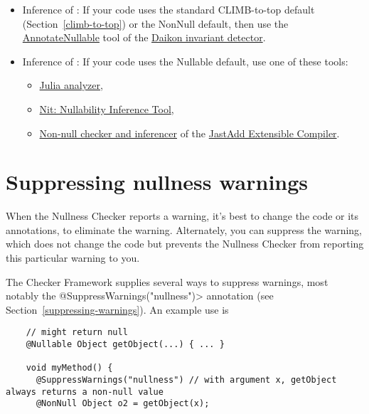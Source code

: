 \begin{itemize}

\item
  Inference of :
  If your code uses the standard CLIMB-to-top default (Section~\ref{climb-to-top}) or
  the NonNull default, then use the
  \href{http://plse.cs.washington.edu/daikon/download/doc/daikon.html#AnnotateNullable}{AnnotateNullable}
  tool of the \href{http://plse.cs.washington.edu/daikon/}{Daikon invariant
    detector}.

\item
  Inference of :
  If your code uses the Nullable default, use one of these tools:
\begin{itemize}
\item
  \href{http://julia.scienze.univr.it/}{Julia analyzer},
\item
  \href{http://nit.gforge.inria.fr}{Nit: Nullability Inference Tool},
\item
  \href{http://jastadd.org/jastadd-tutorial-examples/non-null-types-for-java/}{Non-null
    checker and inferencer} of the \href{http://jastadd.org/}{JastAdd
    Extensible Compiler}.
\end{itemize}

\end{itemize}



\section{Suppressing nullness warnings\label{suppressing-warnings-nullness}}

When the Nullness Checker reports a warning, it's best to change the code
or its annotations, to eliminate the warning.  Alternately, you can
suppress the warning, which does not change the code but prevents the
Nullness Checker from reporting this particular warning to you.

\begin{sloppypar}
The Checker Framework supplies several ways to suppress warnings, most
notably the \<@SuppressWarnings("nullness")> annotation (see
Section~\ref{suppressing-warnings}).  An example use is
\end{sloppypar}

\begin{smaller}
\begin{Verbatim}
    // might return null
    @Nullable Object getObject(...) { ... }

    void myMethod() {
      @SuppressWarnings("nullness") // with argument x, getObject always returns a non-null value
      @NonNull Object o2 = getObject(x);
\end{Verbatim}
\end{smaller}


